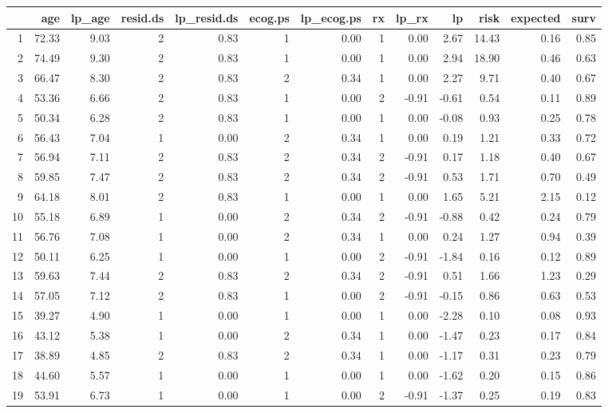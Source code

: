 {\scriptsize
\begin{center}
\begin{tabular}{rrrrrrrrrrrrr}
  \toprule
 & age & lp\_age & resid.ds & lp\_resid.ds & ecog.ps & lp\_ecog.ps & rx & lp\_rx & lp & risk & expected & surv \\ 
  \midrule
  1 & 72.33 & 9.03 & 2 & 0.83 & 1 & 0.00 & 1 & 0.00 & 2.67 & 14.43 & 0.16 & 0.85 \\ 
  2 & 74.49 & 9.30 & 2 & 0.83 & 1 & 0.00 & 1 & 0.00 & 2.94 & 18.90 & 0.46 & 0.63 \\ 
  3 & 66.47 & 8.30 & 2 & 0.83 & 2 & 0.34 & 1 & 0.00 & 2.27 & 9.71 & 0.40 & 0.67 \\ 
  4 & 53.36 & 6.66 & 2 & 0.83 & 1 & 0.00 & 2 & -0.91 & -0.61 & 0.54 & 0.11 & 0.89 \\ 
  5 & 50.34 & 6.28 & 2 & 0.83 & 1 & 0.00 & 1 & 0.00 & -0.08 & 0.93 & 0.25 & 0.78 \\ 
  6 & 56.43 & 7.04 & 1 & 0.00 & 2 & 0.34 & 1 & 0.00 & 0.19 & 1.21 & 0.33 & 0.72 \\ 
  7 & 56.94 & 7.11 & 2 & 0.83 & 2 & 0.34 & 2 & -0.91 & 0.17 & 1.18 & 0.40 & 0.67 \\ 
  8 & 59.85 & 7.47 & 2 & 0.83 & 2 & 0.34 & 2 & -0.91 & 0.53 & 1.71 & 0.70 & 0.49 \\ 
  9 & 64.18 & 8.01 & 2 & 0.83 & 1 & 0.00 & 1 & 0.00 & 1.65 & 5.21 & 2.15 & 0.12 \\ 
  10 & 55.18 & 6.89 & 1 & 0.00 & 2 & 0.34 & 2 & -0.91 & -0.88 & 0.42 & 0.24 & 0.79 \\ 
  11 & 56.76 & 7.08 & 1 & 0.00 & 2 & 0.34 & 1 & 0.00 & 0.24 & 1.27 & 0.94 & 0.39 \\ 
  12 & 50.11 & 6.25 & 1 & 0.00 & 1 & 0.00 & 2 & -0.91 & -1.84 & 0.16 & 0.12 & 0.89 \\ 
  13 & 59.63 & 7.44 & 2 & 0.83 & 2 & 0.34 & 2 & -0.91 & 0.51 & 1.66 & 1.23 & 0.29 \\ 
  14 & 57.05 & 7.12 & 2 & 0.83 & 1 & 0.00 & 2 & -0.91 & -0.15 & 0.86 & 0.63 & 0.53 \\ 
  15 & 39.27 & 4.90 & 1 & 0.00 & 1 & 0.00 & 1 & 0.00 & -2.28 & 0.10 & 0.08 & 0.93 \\ 
  16 & 43.12 & 5.38 & 1 & 0.00 & 2 & 0.34 & 1 & 0.00 & -1.47 & 0.23 & 0.17 & 0.84 \\ 
  17 & 38.89 & 4.85 & 2 & 0.83 & 2 & 0.34 & 1 & 0.00 & -1.17 & 0.31 & 0.23 & 0.79 \\ 
  18 & 44.60 & 5.57 & 1 & 0.00 & 1 & 0.00 & 1 & 0.00 & -1.62 & 0.20 & 0.15 & 0.86 \\ 
  19 & 53.91 & 6.73 & 1 & 0.00 & 1 & 0.00 & 2 & -0.91 & -1.37 & 0.25 & 0.19 & 0.83 \\ 

\end{tabular}
\end{center}}
